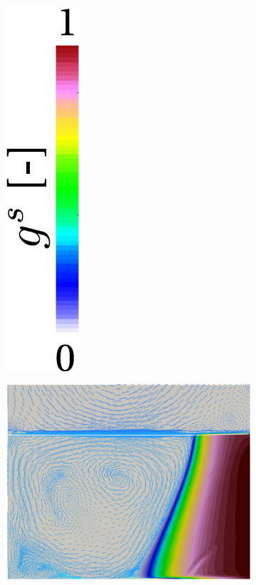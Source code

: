 \begin{figure}[htbp]
\begin{subfigure}[t]{0.15\textwidth}
  \includegraphics[width=0.3\textwidth]{Chapter5/Graphics/2d/colorbar_gs.pdf}
  \end{subfigure}
  \begin{subfigure}[t]{0.4\textwidth}
    \centering
  \includegraphics[width=\textwidth]{Chapter5/Graphics/2d/processed/1200s_gs_vl.png}

\end{subfigure}
\end{figure}

